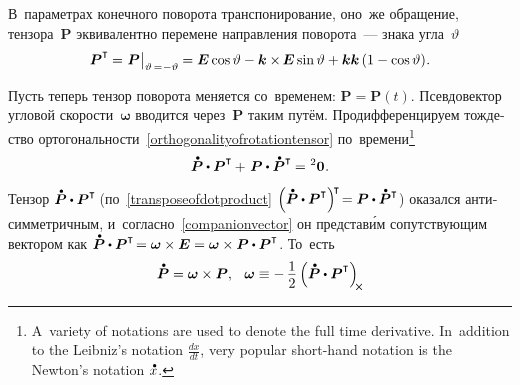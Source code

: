 \begin{otherlanguage}{russian}
\vspace{-0.16em} В~параметрах конечного поворота транспонирование, оно~же обращение, тензора~$\bm{P}$ эквивалентно перемене направления поворота~--- знака угла~$\vartheta$
\[
\bm{P}^{\T} \hspace{-0.1ex}=\hspace{0.1ex} \bm{P} \hspace{0.1ex} \bigr|_{\vartheta \,=\hspace{0.1ex} -\vartheta} \hspace{-0.1ex} = \bm{E} \operatorname{cos} \vartheta - \bm{k} \times\hspace{-0.2ex} \bm{E} \operatorname{sin} \vartheta + \bm{k} \bm{k} \left({1 - \operatorname{cos} \vartheta}\right) \hspace{-0.32ex}.
\]

Пусть теперь тензор поворота меняется со~временем: ${\bm{P} \!=\! \bm{P}(t)}$.
Псевдовектор угловой скорости~${\bm{\omega}}$ вводится через~$\bm{P}$ таким путём.
Продифференцируем тождество ортогональности~\eqref{orthogonalityofrotationtensor} по~времени\footnote{A~variety of notations are used to denote the full time derivative. In~addition to the Leibniz’s notation ${\frac{dx}{dt}}$, very popular short-hand notation is the  Newton’s notation ${\mathdotabove{x}}$.}
\vspace{-0.5em}\[
\mathdotabove{\bm{P}} \dotp \bm{P}^{\T} \hspace{-0.1ex} + \hspace{0.25ex} \bm{P} \dotp \mathdotabove{\bm{P}}^{\T} \hspace{-0.1ex} = \hspace{0.1ex} {^2\bm{0}} \hspace{0.1ex}.
\]

\vspace{-0.4em} Тензор ${\mathdotabove{\bm{P}} \dotp \bm{P}^{\T\!}}$ (по~\eqref{transposeofdotproduct} ${\left({ \mathdotabove{\bm{P}} \dotp \bm{P}^{\T} }\right)^{\raisemath{-0.25em}{\!\T}} \hspace{-0.36ex} = \bm{P} \dotp \mathdotabove{\bm{P}}^{\T}}$) оказался анти\-сим\-метрич\-ным, и~согласно~\eqref{companionvector} он представ\'{и}м сопутствующим вектором как ${\mathdotabove{\bm{P}} \dotp \bm{P}^{\T\!} = \bm{\omega} \times \bm{E} = \bm{\omega} \times \bm{P} \dotp \bm{P}^{\T}}$\!. То~есть
\vspace{0.1em}\begin{equation}\label{angularvelocityvector}
\mathdotabove{\bm{P}} = \bm{\omega} \times \bm{P}, \;\:\:
\bm{\omega} \equiv -\, \displaystyle \onehalf \left( \mathdotabove{\bm{P}} \dotp \bm{P}^{\T} \right)_{\hspace{-0.2em}\Xcompanion}
\vspace{-0.25em}\end{equation}


\end{otherlanguage}
